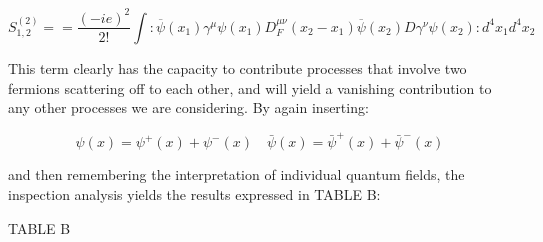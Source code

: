 \documentclass[a4]{article}
\begin{document}
    \begin{framed}
        \begin{equation}
            S^{(2)}_{1,2} = = \frac{(-ie)^2}{2!} \int :\overline{\psi} (x_1) \gamma^{\mu} \psi (x_1) D_{F}^{\mu\nu} (x_2 - x_1) \overline{\psi} (x_2) D \gamma^{\nu} \psi (x_2): d^{4} x_{1} d^{4} x_{2}
        \end{equation}
    \end{framed}

    This term clearly has the capacity to contribute processes that involve two fermions scattering off to each other, and will yield a vanishing contribution
    to any other processes we are considering. By again inserting:

    \begin{equation}
        \psi (x) = \psi^{+} (x) + \psi^{-} (x) \quad \bar{\psi} (x) = \bar{\psi}^{+} (x) + \bar{\psi}^{-} (x)
    \end{equation}

    and then remembering the interpretation of individual quantum fields, the inspection analysis yields the results expressed in TABLE B:

    \begin{center}
        TABLE B
    \end{center}
\end{document}
